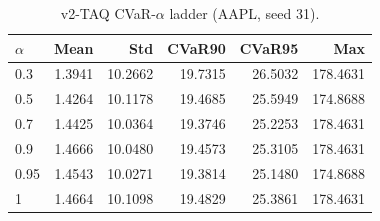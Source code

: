 \begin{table}[H]
    \centering
    \caption{v2-TAQ CVaR-$\alpha$ ladder (AAPL, seed 31).}
    \label{tab:v2_taq_alpha}
    \begin{tabular}{@{}lrrrrr@{}}
        \toprule
        $\alpha$ & Mean & Std & CVaR90 & CVaR95 & Max \\
        \midrule
        0.3 & 1.3941 & 10.2662 & 19.7315 & 26.5032 & 178.4631 \\
        0.5 & 1.4264 & 10.1178 & 19.4685 & 25.5949 & 174.8688 \\
        0.7 & 1.4425 & 10.0364 & 19.3746 & 25.2253 & 178.4631 \\
        0.9 & 1.4666 & 10.0480 & 19.4573 & 25.3105 & 178.4631 \\
        0.95 & 1.4543 & 10.0271 & 19.3814 & 25.1480 & 174.8688 \\
        1 & 1.4664 & 10.1098 & 19.4829 & 25.3861 & 178.4631 \\
        \bottomrule
    \end{tabular}
\end{table}
